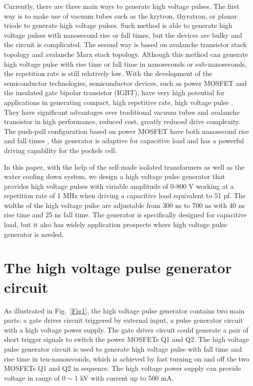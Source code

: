 \documentclass[aip,rsi,reprint,graphicx]{revtex4-1} %
\begin{document}
Currently, there are three main ways to generate high voltage pulses. 
The first way is to make use of vacuum tubes such as the krytron, thyratron, or planar triode to generate high voltage pulses\cite{Rohwein1995improved}. 
Such method is able to generate high voltage pulses with nanosecond rise or fall times, but the devices are bulky and the circuit is complicated. 
The second way is based on avalanche transistor stack topology and avalanche Marx stack topology\cite{Fulkerson1997,Bidin2009,bishop2006subnanosecond}. 
Although this method can generate high voltage pulse with rise time or fall time in nanoseconds or sub-nanoseconds, the repetition rate is still relatively low. 
With the development of the semiconductor technologies, semiconductor devices, such as power MOSFET and the insulated gate bipolar transistor (IGBT), have very high potential for applications in generating compact, high repetitive rate, high voltage pulse \cite{wang2013semiconductor,Feng2011}. 
They have significant advantages over traditional vacuum tubes and avalanche transistor in high performance, reduced cost, greatly reduced drive complexity. 
The push-pull configuration based on power MOSFET have both nanosecond rise and fall times \cite{bernius1990improved}, this generator is adaptive for capacitive load and has a powerful driving capability for the pockels cell.\par 
In this paper, with the help of the self-made isolated transformers as well as the water cooling down system, we design a high voltage pulse generator that provides high voltage pulses with viriable amplitude of 0-800 V working at a repetition rate of 1 MHz when driving a capacitive load equivalent to 51 pf.
 The widths of the high voltage pulse are adjustable from 300 ns to 700 ns with 40 ns rise time and 25 ns fall time.
 The generator is specifically designed for capacitive load, but it also has widely application prospects where high voltage pulse generator is needed.

\section{The high voltage pulse generator circuit}
As illustrated in Fig.~\ref{Fig1}, the high voltage pulse generator contains two main parts: a gate driver circuit triggered by external input, a pulse generator circuit with a high voltage power supply. The gate driver circuit could generate a pair of short trigger signals to switch the power MOSFETs Q1 and Q2. The high voltage pulse generator circuit is used to generate high voltage pulse with fall time and rise time in ten-nanoseconds, which is achieved by fast turning on and off the two MOSFETs Q1 and Q2 in sequence. The high voltage power supply can provide voltage in range of $0\sim1$ kV with current up to 500 mA.
\end{document}
